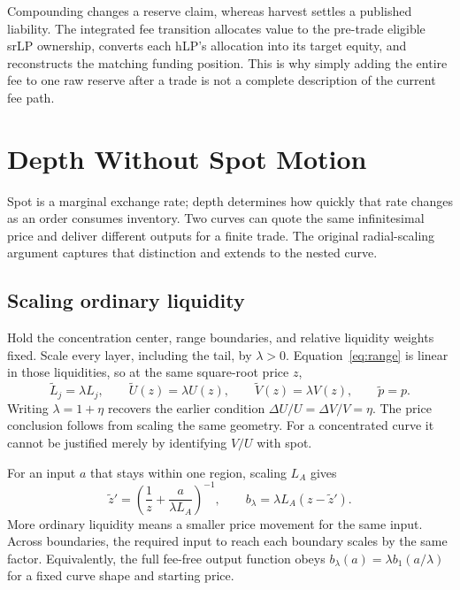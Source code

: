 Compounding changes a reserve claim, whereas harvest settles a published liability. The integrated fee transition allocates value to the pre-trade eligible srLP ownership, converts each hLP's allocation into its target equity, and reconstructs the matching funding position. This is why simply adding the entire fee to one raw reserve after a trade is not a complete description of the current fee path.
\fi

\section{Depth Without Spot Motion}
\label{sec:depth}

Spot is a marginal exchange rate; depth determines how quickly that rate changes as an order consumes inventory. Two curves can quote the same infinitesimal price and deliver different outputs for a finite trade. The original radial-scaling argument captures that distinction and extends to the nested curve.

\subsection{Scaling ordinary liquidity}

Hold the concentration center, range boundaries, and relative liquidity weights fixed. Scale every layer, including the tail, by $\lambda>0$. Equation~\eqref{eq:range} is linear in those liquidities, so at the same square-root price $z$,
\begin{equation}
\widetilde L_j=\lambda L_j,\qquad
\widetilde U(z)=\lambda U(z),\qquad
\widetilde V(z)=\lambda V(z),\qquad \widetilde p=p.
\label{eq:depth-scale}
\end{equation}
Writing $\lambda=1+\eta$ recovers the earlier condition $\Delta U/U=\Delta V/V=\eta$. The price conclusion follows from scaling the same geometry. For a concentrated curve it cannot be justified merely by identifying $V/U$ with spot.

For an input $a$ that stays within one region, scaling $L_A$ gives
\begin{equation}
\widetilde z'=\left(\frac1z+\frac{a}{\lambda L_A}\right)^{-1},
\qquad b_\lambda=\lambda L_A(z-\widetilde z').
\end{equation}
More ordinary liquidity means a smaller price movement for the same input. Across boundaries, the required input to reach each boundary scales by the same factor. Equivalently, the full fee-free output function obeys $b_\lambda(a)=\lambda b_1(a/\lambda)$ for a fixed curve shape and starting price.

